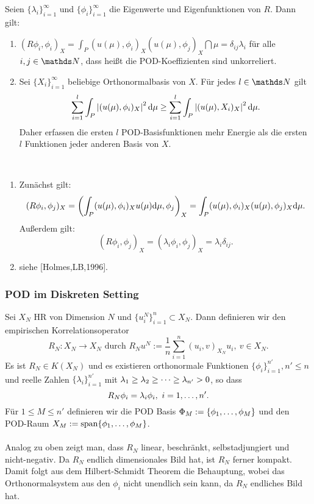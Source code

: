 Seien $\{\lambda_i\}_{i=1}^\infty$ und $\{\phi_i\}_{i=1}^\infty$ die Eigenwerte und Eigenfunktionen von $R$.
Dann gilt:
\begin{enumerate}[(1)]
	\item $(R\phi_i,\phi_i)_X = \int_P (u(\mu),\phi_i)_X (u(\mu),\phi_j)_X \dint\mu = \delta_{ij}\lambda_i$ für alle $i,j\in \N$, dass heißt die POD-Koeffizienten sind unkorreliert.
	\item Sei $\{X_i\}_{i=1}^\infty$ beliebige Orthonormalbasis von $X$.
	Für jedes $l\in \N$ gilt
	\[
	\sum_{i=1}^{l} \int_P \left\vert(u(\mu),\phi_i)_X\right\vert^2\mathrm{d}\mu \ge \sum_{i=1}^{l} \int_P \left\vert(u(\mu),X_i)_X\right\vert^2\mathrm{d}\mu.
	\]
	Daher erfassen die ersten $l$ POD-Basisfunktionen mehr Energie als die ersten $l$ Funktionen jeder anderen Basis von $X$.
\end{enumerate}

\\
\begin{enumerate}[(1)]
	\item Zunächst gilt: 
	\[
	(R\phi_i,\phi_j)_X = \left( \int_P (u(\mu),\phi_i)_X u(\mu) \mathrm{d}\mu,\phi_j\right)_X = \int_P (u(\mu),\phi_i)_X (u(\mu),\phi_j)_X \mathrm{d}\mu.
	\]
	Außerdem gilt:
	\[
	(R\phi_i,\phi_j)_X = (\lambda_i\phi_i,\phi_j)_X = \lambda_i \delta_{ij}.
	\]
	\item siehe [Holmes,LB,1996].
\end{enumerate}

\subsubsection{POD im Diskreten Setting}

Sei $X_N$ HR von Dimension $N$ und $\{u_i^N\}_{i=1}^n\subset X_N$.
Dann definieren wir den empirischen Korrelationsoperator
\[
R_N: X_N\to X_N \text{ durch } R_N u^N := \frac{1}{n} \sum_{i=1}^{n} (u_i,v)_{X_N} u_i ,~ v\in X_N.
\]
Es ist $R_N\in K(X_N)$ und es existieren orthonormale Funktionen $\{\phi_i\}_{i=1}^{n'}, n'\le n$ und reelle Zahlen $\{\lambda_i\}_{i=1}^{n'}$ mit $\lambda_1\ge \lambda_2\ge \dots \ge \lambda_{n'}> 0$, so dass
\[
R_N\phi_i = \lambda_i\phi_i,~i=1, \dots , n'.
\]
Für $1\le M\le n'$ definieren wir die POD Basis $\Phi_M := \{\phi_1, \dots ,\phi_M\}$ und den POD-Raum $X_M:= \operatorname{span}\{\phi_1, \dots ,\phi_M\}$.\\

\\
Analog zu oben zeigt man, dass $R_N$ linear, beschränkt, selbstadjungiert und nicht-negativ.
Da $R_N$ endlich dimensionales Bild hat, ist $R_N$ ferner kompakt.
Damit folgt aus dem Hilbert-Schmidt Theorem die Behauptung, wobei das Orthonormalsystem aus den $\phi_i$ nicht unendlich sein kann, da $R_N$ endliches Bild hat.


